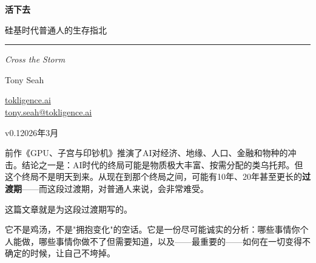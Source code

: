 \documentclass[a4paper,12pt,UTF8]{ctexart}
\renewenvironment{quote}{%
  \list{}{%
    \leftmargin=2em
    \rightmargin=1em
    \topsep=0.5em
    \partopsep=0pt
    \parsep=0.3em
  }%
  \item\relax
  \noindent{\color{quotebar}\vrule width 3pt\hspace{0.8em}}\begin{minipage}[t]{\dimexpr\linewidth-1.3em\relax}\color{quotecolor}\itshape
}{%
  \end{minipage}\endlist
}
\begin{document}
\begin{titlepage}
\begin{center}

\vspace*{4cm}

{\fontsize{28}{34}\selectfont\bfseries\sffamily\color{sectioncolor}
活下去}

\vspace{0.8cm}

{\fontsize{16}{20}\selectfont\sffamily\color{subsectioncolor}
硅基时代普通人的生存指北}

\vspace{0.5cm}

{\color{rulecolor}\rule{0.6\textwidth}{1.5pt}}

\vspace{0.5cm}

{\fontsize{14}{18}\selectfont\itshape\color{gray}
Cross the Storm}

\vspace{3cm}

{\Large\sffamily Tony Seah}

\vspace{1cm}

{\normalsize\color{gray}
\href{https://tokligence.ai}{tokligence.ai}\\[0.3em]
\href{mailto:tony.seah@tokligence.ai}{tony.seah@tokligence.ai}}

\vfill

{\normalsize\color{gray} v0.1\quad 2026年3月}

\end{center}
\restoregeometry
\end{titlepage}

\newpage
\tableofcontents
\newpage


\begin{quote}
前作《GPU、子宫与印钞机》推演了AI对经济、地缘、人口、金融和物种的冲击。结论之一是：AI时代的终局可能是物质极大丰富、按需分配的类乌托邦。但这个终局不是明天到来。从现在到那个终局之间，可能有10年、20年甚至更长的\textbf{过渡期}——而这段过渡期，对普通人来说，会非常难受。

这篇文章就是为这段过渡期写的。

它不是鸡汤，不是"拥抱变化"的空话。它是一份尽可能诚实的分析：哪些事情你个人能做，哪些事情你做不了但需要知道，以及——最重要的——如何在一切变得不确定的时候，让自己不垮掉。
\end{quote}
\end{document}

